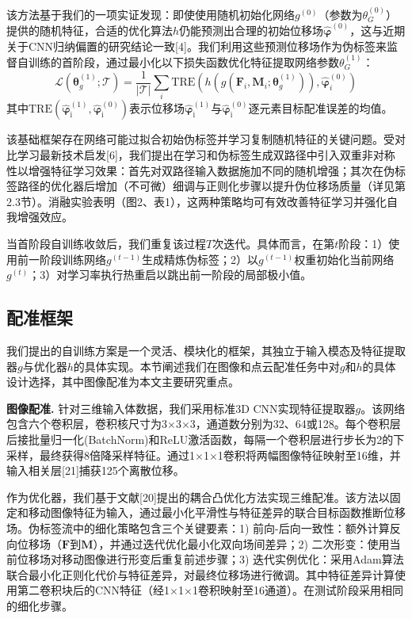 该方法基于我们的一项实证发现：即使使用随机初始化网络$g^{(0)}$（参数为$\theta_G^{(0)}$）提供的随机特征，合适的优化算法$h$仍能预测出合理的初始位移场$\hat{\boldsymbol{\varphi}}^{(0)}$，这与近期关于CNN归纳偏置的研究结论一致[4]。我们利用这些预测位移场作为伪标签来监督自训练的首阶段，通过最小化以下损失函数优化特征提取网络参数$\theta_G^{(1)}$：
\begin{equation}\tag*{(2)}
  \mathcal{L}(\boldsymbol{\theta}_g^{(1)};\mathcal{T})=\frac{1}{|\mathcal{T}|}\sum_i\mathrm{TRE}\left(h\left(g\left(\boldsymbol{F}_i,\boldsymbol{M}_i;\boldsymbol{\theta}_g^{(1)}\right)\right),\hat{\boldsymbol{\varphi}}_i^{(0)}\right)
\end{equation}
其中$\mathrm{TRE}(\hat{\boldsymbol{\varphi}}_\mathrm{i}^{(1)},\hat{\boldsymbol{\varphi}}_\mathrm{i}^{(0)})$表示位移场$\hat{\boldsymbol{\varphi}}_\mathrm{i}^{(1)}$与$\hat{\boldsymbol{\varphi}}_\mathrm{i}^{(0)}$逐元素目标配准误差的均值。

该基础框架存在网络可能过拟合初始伪标签并学习复制随机特征的关键问题。受对比学习最新技术启发[6]，我们提出在学习和伪标签生成双路径中引入双重非对称性以增强特征学习效果：首先对双路径输入数据施加不同的随机增强；其次在伪标签路径的优化器后增加（不可微）细调与正则化步骤以提升伪位移场质量（详见第2.3节）。消融实验表明（图2、表1），这两种策略均可有效改善特征学习并强化自我增强效应。

当首阶段自训练收敛后，我们重复该过程$T$次迭代。具体而言，在第$t$阶段：1）使用前一阶段训练网络$g^{(t-1)}$生成精炼伪标签；2）以$g^{(t-1)}$权重初始化当前网络$g^{(t)}$；3）对学习率执行热重启以跳出前一阶段的局部极小值。

\subsection{配准框架}

我们提出的自训练方案是一个灵活、模块化的框架，其独立于输入模态及特征提取器$g$与优化器$h$的具体实现。本节阐述我们在图像和点云配准任务中对$g$和$h$的具体设计选择，其中图像配准为本文主要研究重点。

\textbf{图像配准.} 针对三维输入体数据，我们采用标准3D CNN实现特征提取器$g$。该网络包含六个卷积层，卷积核尺寸为3$\times$3$\times$3，通道数分别为32、64或128。每个卷积层后接批量归一化(BatchNorm)和ReLU激活函数，每隔一个卷积层进行步长为2的下采样，最终获得8倍降采样特征。通过1$\times$1$\times$1卷积将两幅图像特征映射至16维，并输入相关层[21]捕获125个离散位移。

作为优化器，我们基于文献[20]提出的耦合凸优化方法实现三维配准。该方法以固定和移动图像特征为输入，通过最小化平滑性与特征差异的联合目标函数推断位移场。伪标签流中的细化策略包含三个关键要素：1) 前向-后向一致性：额外计算反向位移场（$\boldsymbol{F}$到$\boldsymbol{M}$），并通过迭代优化最小化双向场间差异；2) 二次形变：使用当前位移场对移动图像进行形变后重复前述步骤；3) 迭代实例优化：采用Adam算法联合最小化正则化代价与特征差异，对最终位移场进行微调。其中特征差异计算使用第二卷积块后的CNN特征（经1$\times$1$\times$1卷积映射至16通道）。在测试阶段采用相同的细化步骤。

